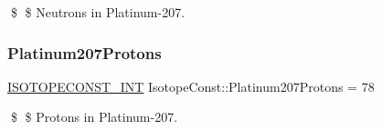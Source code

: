 \$ \$ Neutrons in Platinum-\/207. \mbox{\label{group___isotope_const-_platinum-_pt207_ga0737cb34b3e1b751a66455235df2bdfb}} 
\subsubsection{\texorpdfstring{Platinum207\+Protons}{Platinum207Protons}}
{\footnotesize\ttfamily \mbox{\hyperlink{group___isotope_const-_macros_ga5f18360b3e99483a35c32d789e62621c}{I\+S\+O\+T\+O\+P\+E\+C\+O\+N\+S\+T\+\_\+\+I\+NT}} Isotope\+Const\+::\+Platinum207\+Protons = 78}

\$ \$ Protons in Platinum-\/207. 